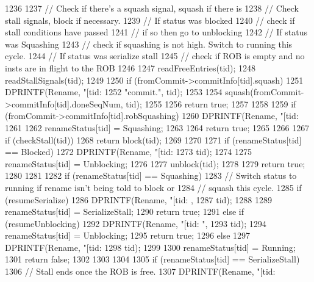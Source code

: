 \begin{DoxyCode}
1236 {
1237     // Check if there's a squash signal, squash if there is
1238     // Check stall signals, block if necessary.
1239     // If status was blocked
1240     //     check if stall conditions have passed
1241     //         if so then go to unblocking
1242     // If status was Squashing
1243     //     check if squashing is not high.  Switch to running this cycle.
1244     // If status was serialize stall
1245     //     check if ROB is empty and no insts are in flight to the ROB
1246 
1247     readFreeEntries(tid);
1248     readStallSignals(tid);
1249 
1250     if (fromCommit->commitInfo[tid].squash) {
1251         DPRINTF(Rename, "[tid:%
1252                 "commit.\n", tid);
1253 
1254         squash(fromCommit->commitInfo[tid].doneSeqNum, tid);
1255 
1256         return true;
1257     }
1258 
1259     if (fromCommit->commitInfo[tid].robSquashing) {
1260         DPRINTF(Rename, "[tid:%
1261 
1262         renameStatus[tid] = Squashing;
1263 
1264         return true;
1265     }
1266 
1267     if (checkStall(tid)) {
1268         return block(tid);
1269     }
1270 
1271     if (renameStatus[tid] == Blocked) {
1272         DPRINTF(Rename, "[tid:%
1273                 tid);
1274 
1275         renameStatus[tid] = Unblocking;
1276 
1277         unblock(tid);
1278 
1279         return true;
1280     }
1281 
1282     if (renameStatus[tid] == Squashing) {
1283         // Switch status to running if rename isn't being told to block or
1284         // squash this cycle.
1285         if (resumeSerialize) {
1286             DPRINTF(Rename, "[tid:%
      ,
1287                     tid);
1288 
1289             renameStatus[tid] = SerializeStall;
1290             return true;
1291         } else if (resumeUnblocking) {
1292             DPRINTF(Rename, "[tid:%
      ",
1293                     tid);
1294             renameStatus[tid] = Unblocking;
1295             return true;
1296         } else {
1297             DPRINTF(Rename, "[tid:%
1298                     tid);
1299 
1300             renameStatus[tid] = Running;
1301             return false;
1302         }
1303     }
1304 
1305     if (renameStatus[tid] == SerializeStall) {
1306         // Stall ends once the ROB is free.
1307         DPRINTF(Rename, "[tid:%
}}
\end{DoxyCode}

